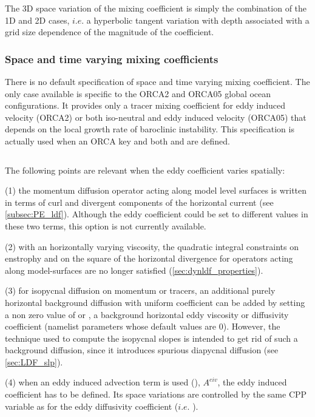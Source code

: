 \documentclass[../tex_main/NEMO_manual]{subfiles}
\begin{document}
The 3D space variation of the mixing coefficient is simply the combination of the 
1D and 2D cases, $i.e.$ a hyperbolic tangent variation with depth associated with 
a grid size dependence of the magnitude of the coefficient. 

\subsubsection{Space and time varying mixing coefficients}

There is no default specification of space and time varying mixing coefficient. 
The only case available is specific to the ORCA2 and ORCA05 global ocean 
configurations. It provides only a tracer 
mixing coefficient for eddy induced velocity (ORCA2) or both iso-neutral and 
eddy induced velocity (ORCA05) that depends on the local growth rate of 
baroclinic instability. This specification is actually used when an ORCA key 
and both  and  are defined.

$\ $\newline    %

The following points are relevant when the eddy coefficient varies spatially:

(1) the momentum diffusion operator acting along model level surfaces is 
written in terms of curl and divergent components of the horizontal current 
(see \autoref{subsec:PE_ldf}). Although the eddy coefficient could be set to different values 
in these two terms, this option is not currently available. 

(2) with an horizontally varying viscosity, the quadratic integral constraints 
on enstrophy and on the square of the horizontal divergence for operators 
acting along model-surfaces are no longer satisfied 
(\autoref{sec:dynldf_properties}).

(3) for isopycnal diffusion on momentum or tracers, an additional purely 
horizontal background diffusion with uniform coefficient can be added by 
setting a non zero value of  or , a background horizontal 
eddy viscosity or diffusivity coefficient (namelist parameters whose default 
values are $0$). However, the technique used to compute the isopycnal 
slopes is intended to get rid of such a background diffusion, since it introduces 
spurious diapycnal diffusion (see \autoref{sec:LDF_slp}).

(4) when an eddy induced advection term is used (), $A^{eiv}$, 
the eddy induced coefficient has to be defined. Its space variations are controlled 
by the same CPP variable as for the eddy diffusivity coefficient ($i.e.$ 
). 
\end{document}
